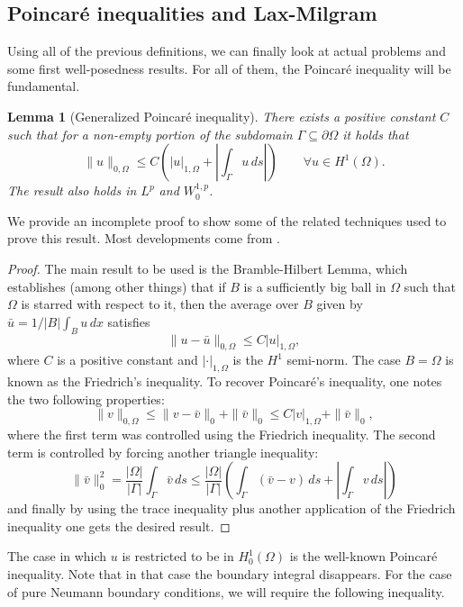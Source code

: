 \documentclass{article}
\newtheorem{lemma}{Lemma}
\begin{document}
\subsection{Poincaré inequalities and Lax-Milgram}


Using all of the previous definitions, we can finally look at actual problems and some first well-posedness results. For all of them, the Poincaré inequality will be fundamental.

\begin{lemma}[Generalized Poincaré inequality] There exists a positive constant $C$ such that for a non-empty portion of the subdomain $\Gamma \subseteq \partial\Omega$ it holds that
        $$ \| u \|_{0,\Omega} \leq C\left(| u |_{1,\Omega} + \left|\int_\Gamma u\,ds\right| \right) \qquad \forall u \in H^1(\Omega). $$
The result also holds in $L^p$ and $W_0^{1,p}$. 
\end{lemma}

We provide an incomplete proof to show some of the related techniques used to prove this result. Most developments come from \cite{brenner2008mathematical}.
\begin{proof}
    The main result to be used is the Bramble-Hilbert Lemma, which establishes (among other things) that if $B$ is a sufficiently big ball in $\Omega$ such that $\Omega$ is starred with respect to it, then the average over $B$ given by $\bar u = 1/|B|\int_B u\,dx$ satisfies
    $$ \| u - \bar u \|_{0,\Omega} \leq C| u |_{1,\Omega}, $$
where $C$ is a positive constant and $|\cdot|_{1,\Omega}$ is the $H^1$ semi-norm. The case $B=\Omega$ is known as the Friedrich's inequality. To recover Poincaré's inequality, one notes the two following properties: 
    $$ \|v \|_{0,\Omega} \leq \| v - \bar v\|_0 + \| \bar v\|_0 \leq C | v |_{1,\Omega} + \|\bar v\|_0,$$
where the first term was controlled using the Friedrich inequality. The second term is controlled by forcing another triangle inequality: 
    $$ \| \bar v\|^2_0 = \frac{|\Omega|}{|\Gamma|} \int_\Gamma \bar v\,ds \leq \frac{|\Omega|}{|\Gamma|}\left(\int_\Gamma (\bar v - v)\,ds + \left| \int_\Gamma v \,ds \right| \right)$$
and finally by using the trace inequality plus another application of the Friedrich inequality one gets the desired result. 
\end{proof}

The case in which $u$ is restricted to be in $H_0^1(\Omega)$ is the well-known Poincaré inequality. Note that in that case the boundary integral disappears. For the case of pure Neumann boundary conditions, we will require the following inequality.
\end{document}
